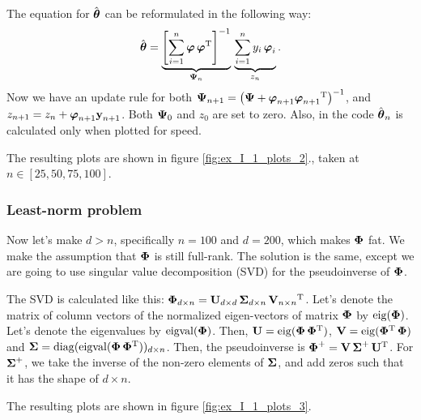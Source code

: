 The equation for $\hat{\v{\theta}}$ can be reformulated in the following way:
\begin{equation}
	\hat{\v{\theta}} = \underbrace{\left[\sum\limits_{i=1}^n{\v{\varphi}\,\v{\varphi}\T}\right]^{-1}}_{\v{\Psi}_n}\,
	\underbrace{\sum\limits_{i=1}^n{y_{i}\,\v{\varphi}_{i} }}_{z_n}.
\end{equation}
Now we have an update rule for both $\v{\Psi}_{n+1} = \brc{\v{\Psi} + \v{\varphi}_{n+1}\v{\varphi}_{n+1}\T}^{-1}$, and $z_{n+1} = z_n + \v{\varphi}_{n+1}\v{y}_{n+1}$.
Both $\v{\Psi}_0$ and $z_0$ are set to zero. 
Also, in the code $\hat{\v{\theta}}_n$ is calculated only when plotted for speed.

The resulting plots are shown in figure \ref{fig:ex_I_1_plots_2}.,
taken at $n\in[25, 50, 75, 100]$.

\subsubsection*{Least-norm problem}

Now let's make $d>n$, specifically $n=100$ and $d=200$, which makes $\v{\Phi}$ fat.
We make the assumption that $\v{\Phi}$ is still full-rank.
The solution is the same, except we are going to use singular value decomposition (SVD)
for the pseudoinverse of $\v{\Phi}$.

The SVD is calculated like this: $\v{\Phi}_{d\times n}=\v{U}_{d\times d}\,\v{\Sigma}_{d\times n}\,\v{V}_{n\times n}\T$. Let's denote the matrix of column vectors of the normalized eigen-vectors 
of matrix $\v{\Phi}$ by $\eig(\v{\Phi})$. Let's denote the eigenvalues by $\operatorname{eigval}(\v{\Phi})$.
Then, $\v{U} = \eig(\v{\Phi}\,\v{\Phi}\T)$, $\v{V} = \eig(\v{\Phi}\T\,\v{\Phi})$ and
$\v{\Sigma} = \diag(\operatorname{eigval}(\v{\Phi}\,\v{\Phi}\T))_{d\times n}$.
Then, the pseudoinverse is $\v{\Phi}^+=\v{V}\,\v{\Sigma}^+\,\v{U}\T$.
For $\v{\Sigma}^+$, we take the inverse of the non-zero elements of $\v{\Sigma}$, and add
zeros such that it has the shape of $d\times n$.

The resulting plots are shown in figure \ref{fig:ex_I_1_plots_3}.

